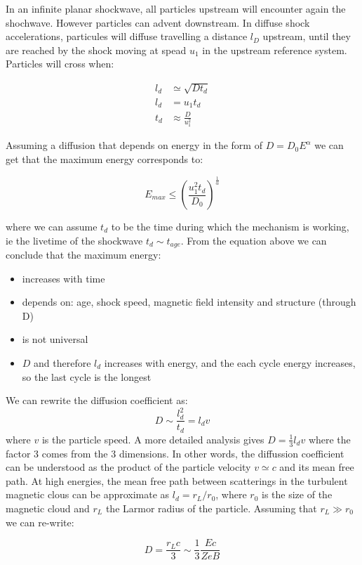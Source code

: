 \documentclass[
  letterpaper,
  DIV=11,
  numbers=noendperiod]{scrreprt}
\providecommand{\tightlist}{%
  \setlength{\itemsep}{0pt}\setlength{\parskip}{0pt}}\usepackage{longtable,booktabs,array}
\begin{document}
In an infinite planar shockwave, all particles upstream will encounter
again the shochwave. However particles can advent downstream. In diffuse
shock accelerations, particules will diffuse travelling a distance
\(l_D\) upstream, until they are reached by the shock moving at spead
\(u_1\) in the upstream reference system. Particles will cross when:

\[\begin{aligned}
l_d &\simeq \sqrt{D t_d} \\
l_d &= u_1 t_d \\
t_d &\approx \frac{D}{u_1^2}
 \end{aligned}\]

Assuming a diffusion that depends on energy in the form of
\(D = D_0 E^{\alpha}\) we can get that the maximum energy corresponds
to:

\[E_{max} \leq \left(\frac{u_1^2 t_d}{D_0}\right)^{\frac{1}{\alpha}}\]

where we can assume \(t_d\) to be the time during which the mechanism is
working, ie the livetime of the shockwave \(t_d \sim t_{age}\). From the
equation above we can conclude that the maximum energy:

\begin{itemize}
\tightlist
\item
  increases with time
\item
  depends on: age, shock speed, magnetic field intensity and structure
  (through D)
\item
  is not universal
\item
  \(D\) and therefore \(l_d\) increases with energy, and the each cycle
  energy increases, so the last cycle is the longest
\end{itemize}

We can rewrite the diffusion coefficient as:
\[ D \sim \frac{l_d^2}{t_d} = l_d v \] where \(v\) is the particle
speed. A more detailed analysis gives \(D = \frac{1}{3}l_d v\) where the
factor 3 comes from the 3 dimensions. In other words, the diffussion
coefficient can be understood as the product of the particle velocity
\(v \simeq c\) and its mean free path. At high energies, the mean free
path between scatterings in the turbulent magnetic clous can be
approximate as \(l_d = r_L/r_0\), where \(r_0\) is the size of the
magnetic cloud and \(r_L\) the Larmor radius of the particle. Assuming
that \(r_L \gg r_0\) we can re-write:

\[ D = \frac{r_L c}{3} \sim \frac{1}{3}\frac{E c}{Z eB} \]
\end{document}

